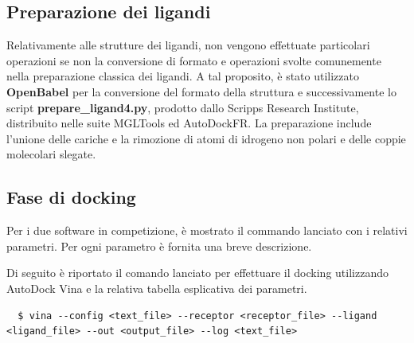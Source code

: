 \subsection{Preparazione dei ligandi}
Relativamente alle strutture dei ligandi, non vengono effettuate particolari operazioni se non la conversione di formato e operazioni svolte comunemente nella preparazione classica dei ligandi. 
A tal proposito, è stato utilizzato \textbf{OpenBabel} per la conversione del formato della struttura e successivamente lo script \textbf{prepare\_ligand4.py}, prodotto dallo Scripps Research Institute, distribuito nelle suite MGLTools ed AutoDockFR.
La preparazione include l'unione delle cariche e la rimozione di atomi di idrogeno non polari e delle coppie molecolari slegate.


\subsection{Fase di docking}
Per i due software in competizione, è mostrato il commando lanciato con i relativi parametri. Per ogni parametro è fornita una breve descrizione.

Di seguito è riportato il comando lanciato per effettuare il docking utilizzando AutoDock Vina e la relativa tabella esplicativa dei parametri.


\begin{verbatim}
  $ vina --config <text_file> --receptor <receptor_file> --ligand <ligand_file> --out <output_file> --log <text_file>
\end{verbatim}
%

